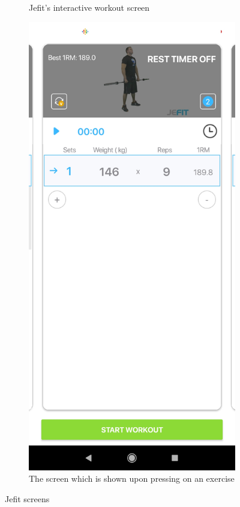 \documentclass{l4proj}
\begin{document}
\begin{figure}[H]
\begin{subfigure}{0.45\textwidth}
        \caption{Jefit's interactive workout screen} 
    \end{subfigure}
    \begin{subfigure}{0.45\textwidth}
      \includegraphics[width=\textwidth]{jefit_2.png}    
      \caption{The screen which is shown upon pressing on an exercise}
    \end{subfigure}
    \caption{Jefit screens}
    \label{fig:jefit}
\end{figure}
\end{document}
